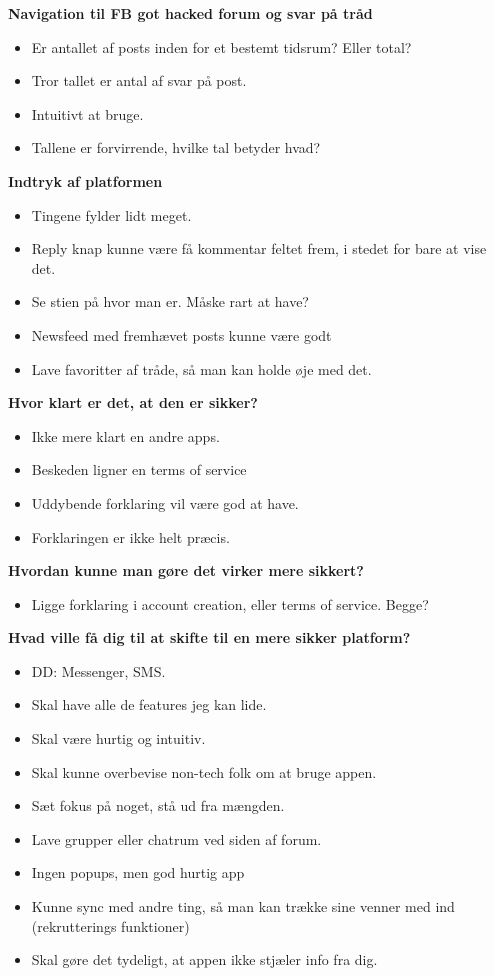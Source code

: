 \noindent\textbf{Navigation til FB got hacked forum og svar på tråd}
\begin{itemize}
    \item Er antallet af posts inden for et bestemt tidsrum? Eller total?
    \item Tror tallet er antal af svar på post.
    \item Intuitivt at bruge.
    \item Tallene er forvirrende, hvilke tal betyder hvad?
\end{itemize}

\noindent\textbf{Indtryk af platformen}
\begin{itemize}
    \item Tingene fylder lidt meget.
    \item Reply knap kunne være få kommentar feltet frem, i stedet for bare at vise det.
    \item Se stien på hvor man er. Måske rart at have?
    \item Newsfeed med fremhævet posts kunne være godt
    \item Lave favoritter af tråde, så man kan holde øje med det.
\end{itemize}

\noindent\textbf{Hvor klart er det, at den er sikker?}
\begin{itemize}
    \item Ikke mere klart en andre apps.
    \item Beskeden ligner en terms of service
    \item Uddybende forklaring vil være god at have. 
    \item Forklaringen er ikke helt præcis.
\end{itemize}

\noindent\textbf{Hvordan kunne man gøre det virker mere sikkert?}
\begin{itemize}
    \item Ligge forklaring i account creation, eller terms of service. Begge?
\end{itemize}

\noindent\textbf{Hvad ville få dig til at skifte til en mere sikker platform?}
\begin{itemize}
    \item DD: Messenger, SMS.
    \item Skal have alle de features jeg kan lide.
    \item Skal være hurtig og intuitiv.
    \item Skal kunne overbevise non-tech folk om at bruge appen.
    \item Sæt fokus på noget, stå ud fra mængden.
    \item Lave grupper eller chatrum ved siden af forum.
    \item Ingen popups, men god hurtig app
    \item Kunne sync med andre ting, så man kan trække sine venner med ind (rekrutterings funktioner)
    \item Skal gøre det tydeligt, at appen ikke stjæler info fra dig. 
\end{itemize}

